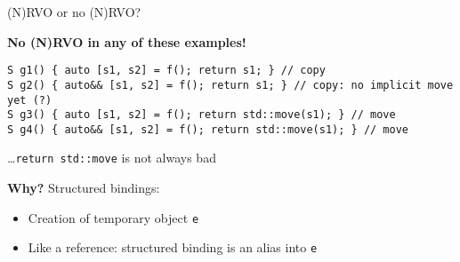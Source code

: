 \begin{frame}[fragile]{(N)RVO or no (N)RVO?}
    \begin{center}
    \end{center}

    \textbf{No (N)RVO in any of these examples!}
    \begin{lstlisting}
S g1() { auto [s1, s2] = f(); return s1; } // copy
S g2() { auto&& [s1, s2] = f(); return s1; } // copy: no implicit move yet (?)
S g3() { auto [s1, s2] = f(); return std::move(s1); } // move
S g4() { auto&& [s1, s2] = f(); return std::move(s1); } // move
    \end{lstlisting}
    
    \hfill \ldots \texttt{return std::move} is not always bad

    \textbf{Why?} Structured bindings:
    \begin{itemize}
        \item Creation of temporary object \texttt{e}
        \item Like a reference: structured binding is an alias into \texttt{e}
    \end{itemize}
\end{frame}

